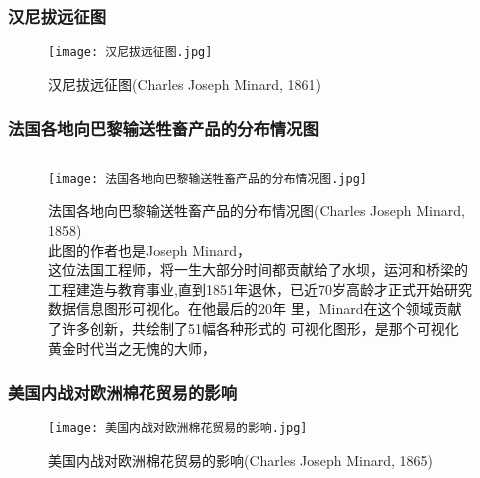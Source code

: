 \subsubsection{汉尼拔远征图}
\begin{frame}{\subsecname}{\subsubsecname}
 \begin{figure}
   \centering \texttt{[image: 汉尼拔远征图.jpg]}
   \caption{汉尼拔远征图(Charles Joseph Minard, 1861)}
 \end{figure}
\end{frame}

\subsubsection{法国各地向巴黎输送牲畜产品的分布情况图}
\begin{frame}{\subsecname}{\subsubsecname}
  \begin{figure}
    \begin{columns}
      \begin{column}{.6\textwidth}
        \texttt{[image: 法国各地向巴黎输送牲畜产品的分布情况图.jpg]}
      \end{column}

      \begin{column}{.35\textwidth}
        \centering
        \caption{法国各地向巴黎输送牲畜产品的分布情况图(Charles Joseph Minard, 1858)\\
          此图的作者也是Joseph Minard，\\
          这位法国工程师，将一生大部分时间都贡献给了水坝，运河和桥梁的
          工程建造与教育事业,直到1851年退休，已近70岁高龄才正式开始研究数据信息图形可视化。在他最后的20年
          里，Minard在这个领域贡献了许多创新，共绘制了51幅各种形式的
          可视化图形，是那个可视化黄金时代当之无愧的大师，}
      \end{column}
    \end{columns}
  \end{figure}
\end{frame}

\subsubsection{美国内战对欧洲棉花贸易的影响}
\begin{frame}{\subsecname}{\subsubsecname}
 \begin{figure}
   \centering \texttt{[image: 美国内战对欧洲棉花贸易的影响.jpg]}
   \caption{美国内战对欧洲棉花贸易的影响(Charles Joseph Minard, 1865)}
 \end{figure}
\end{frame}

